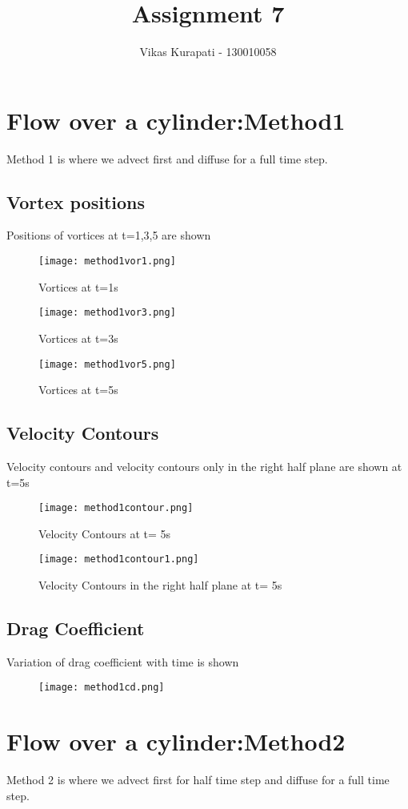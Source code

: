 \documentclass[11pt, a4paper]{article}
\title{\textbf{Assignment 7}}
\author{Vikas Kurapati - 130010058}
\begin{document}
\maketitle
\newpage
\section{Flow over a cylinder:Method1}
Method 1 is where we advect first and diffuse for a full time step.
\subsection{Vortex positions}
Positions of vortices at t=1,3,5 are shown 
\begin{figure}[H]
\centering
\texttt{[image: method1vor1.png]}
\caption{Vortices at t=1s}
\end{figure}
\begin{figure}[H]
\centering
\texttt{[image: method1vor3.png]}
\caption{Vortices at t=3s}
\end{figure}
\begin{figure}[H]
\centering
\texttt{[image: method1vor5.png]}
\caption{Vortices at t=5s}
\end{figure}
\subsection{Velocity Contours}
Velocity contours and velocity contours only in the right half plane are shown at t=5s
\begin{figure}[H]
\texttt{[image: method1contour.png]}
\caption{Velocity Contours at t= 5s}
\end{figure}
\begin{figure}[H]
\texttt{[image: method1contour1.png]}
\caption{Velocity Contours in the right half plane at t= 5s}
\end{figure}
\subsection{Drag Coefficient}
Variation of drag coefficient with time is shown
\begin{figure}[H]
\texttt{[image: method1cd.png]}
\end{figure}
\section{Flow over a cylinder:Method2}
Method 2 is where we advect first for half time step and diffuse for a full time step.
\end{document}

